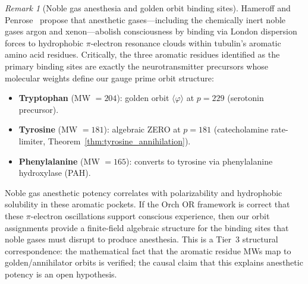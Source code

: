 \documentclass[12pt,oneside]{article}
\theoremstyle{principia}
\theoremstyle{definition}
\theoremstyle{remark}
\newtheorem{remark}[theorem]{Remark}
\providecommand{\vp}{\varphi}
\begin{document}
\begin{remark}[Noble gas anesthesia and golden orbit binding sites]
Hameroff and Penrose~\cite{hameroff2014} propose that anesthetic gases---including the chemically inert noble gases argon and xenon---abolish consciousness by binding via London dispersion forces to hydrophobic $\pi$-electron resonance clouds within tubulin's aromatic amino acid residues. Critically, the three aromatic residues identified as the primary binding sites are exactly the neurotransmitter precursors whose molecular weights define our gauge prime orbit structure:
\begin{itemize}[noitemsep]
  \item \textbf{Tryptophan} (MW $= 204$): golden orbit $\langle\vp\rangle$ at $p = 229$ (serotonin precursor).
  \item \textbf{Tyrosine} (MW $= 181$): algebraic ZERO at $p = 181$ (catecholamine rate-limiter, Theorem~\ref{thm:tyrosine_annihilation}).
  \item \textbf{Phenylalanine} (MW $= 165$): converts to tyrosine via phenylalanine hydroxylase (PAH).
\end{itemize}
Noble gas anesthetic potency correlates with polarizability and hydrophobic solubility in these aromatic pockets. If the Orch OR framework is correct that these $\pi$-electron oscillations support conscious experience, then our orbit assignments provide a finite-field algebraic structure for the binding sites that noble gases must disrupt to produce anesthesia. This is a Tier~3 structural correspondence: the mathematical fact that the aromatic residue MWs map to golden/annihilator orbits is verified; the causal claim that this explains anesthetic potency is an open hypothesis.
\end{remark}
\end{document}
